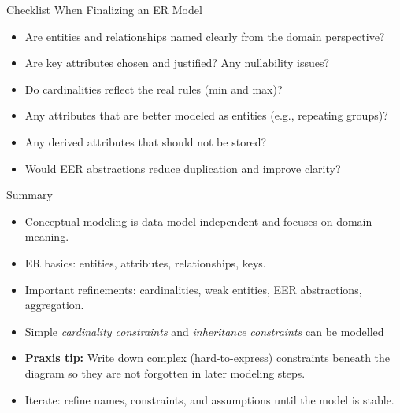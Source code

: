 \documentclass[10pt,aspectratio=169]{beamer}
\begin{document}
\begin{frame}{Checklist When Finalizing an ER Model}
\begin{itemize}
  \item Are entities and relationships named clearly from the domain perspective?
  \item Are key attributes chosen and justified? Any nullability issues?
  \item Do cardinalities reflect the real rules (min and max)?
  \item Any attributes that are better modeled as entities (e.g., repeating groups)?
  \item Any derived attributes that should not be stored?
  \item Would EER abstractions reduce duplication and improve clarity?
\end{itemize}
\end{frame}

\begin{frame}{Summary}
\begin{itemize}
  \item Conceptual modeling is data-model independent and focuses on domain meaning.
  \item ER basics: entities, attributes, relationships, keys.
  \item Important refinements: cardinalities, weak entities, EER abstractions, aggregation.
  \item Simple \textit{cardinality constraints} and \textit{inheritance constraints} can be modelled
  \item \textbf{Praxis tip:} Write down complex (hard-to-express) constraints beneath the diagram so they are not forgotten in later modeling steps.
  \item Iterate: refine names, constraints, and assumptions until the model is stable.
\end{itemize}
\end{frame}
\end{document}
